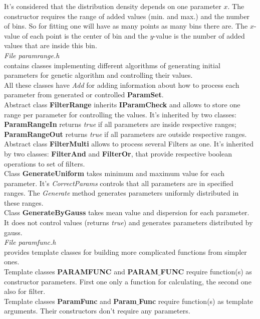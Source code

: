 \documentclass[a4paper]{article}
\begin{document}
It's considered that the distribution density depends on one parameter $x$.
The constructor requires the range of added values (min. and max.) and the number of bins.
So for fitting one will have as many points as many bins there are.
The $x$-value of each point is the center of bin and the $y$-value is the number of added values that are inside this bin.
\\
\textit{\Large File paramrange.h}\\
contains classes implementing different algorithms of generating initial parameters for genetic algorithm and controlling their values. \\
All these classes have \textit{Add} for adding information about how to process each parameter from generated or controlled \textbf{ParamSet}.
\\
Abstract class \textbf{FilterRange} inherits \textbf{IParamCheck} and allows to store one range per parameter for controlling the values. 
It's inherited by two classes: \textbf{ParamRangeIn} returns \textit{true} if all parameters are inside respective ranges; \textbf{ParamRangeOut} returns \textit{true} if all parameters are outside respective ranges.
\\
Abstract class \textbf{FilterMulti} allows to process several Filters as one. It's inherited by two classes: \textbf{FilterAnd} and \textbf{FilterOr}, that provide respective boolean operations to set of filters.
\\
Class \textbf{GenerateUniform} takes minimum and maximum value for each parameter.
It's \textit{CorrectParams} controls that all parameters are in specified ranges.
The \textit{Generate} method generates parameters uniformly distributed in these ranges.
\\
Class \textbf{GenerateByGauss} takes mean value and dispersion for each parameter. It does not control values (returns \textit{true}) and generates parameters distributed by gauss.
\\
\textit{\Large File paramfunc.h}\\
provides template classes for building more complicated functions from simpler ones.
\\
Template classes \textbf{PARAMFUNC} and \textbf{PARAM$\_$FUNC} 
require function(s) as constructor parameters.
First one only a function for calculating, the second one also for filter.
\\
Template classes \textbf{ParamFunc} and \textbf{Param$\_$Func} 
require function(s) as template arguments.
Their constructors don't require any parameters.
\end{document}
